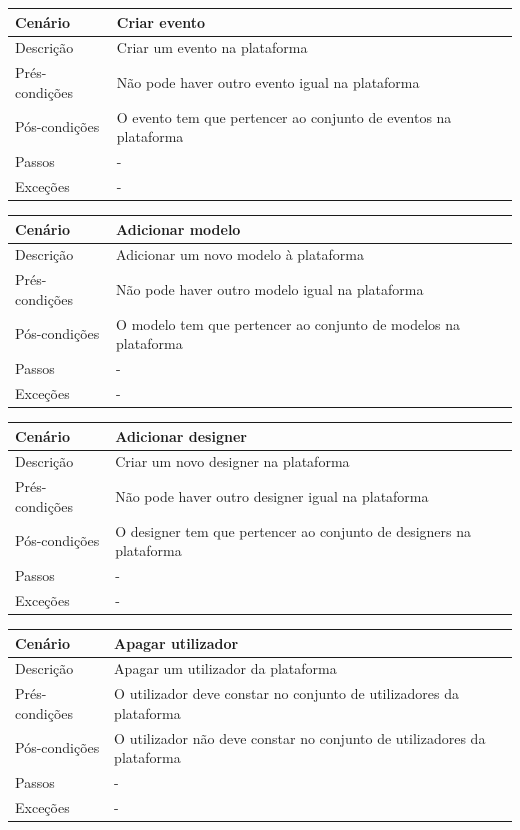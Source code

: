 \documentclass{article}
\begin{document}
\begin{center}
\begin{tabular}{ |p{2.5cm}|p{9cm}| }
\hline
 Cenário & Criar evento \\
\hline
Descrição & 	Criar um evento na plataforma\\
\hline
 Prés-condições &  Não pode haver outro evento igual na plataforma\\
\hline
Pós-condições & O evento tem que pertencer ao conjunto de eventos na plataforma\\
\hline
Passos &  -\\
\hline
Exceções & -\\
\hline
\end{tabular}
\end{center}

\begin{center}
\begin{tabular}{ |p{2.5cm}|p{9cm}| }
\hline
 Cenário & Adicionar modelo \\
\hline
Descrição & 	Adicionar um novo modelo à plataforma\\
\hline
 Prés-condições &  Não pode haver outro modelo igual na plataforma\\
\hline
Pós-condições & O modelo tem que pertencer ao conjunto de modelos na plataforma\\
\hline
Passos &  -\\
\hline
Exceções & -\\
\hline
\end{tabular}
\end{center}

\begin{center}
\begin{tabular}{ |p{2.5cm}|p{9cm}| }
\hline
 Cenário & Adicionar designer \\
\hline
Descrição & 	Criar um novo designer na plataforma\\
\hline
 Prés-condições &  Não pode haver outro designer igual na plataforma\\
\hline
Pós-condições & O designer tem que pertencer ao conjunto de designers na plataforma\\
\hline
Passos &  -\\
\hline
Exceções & -\\
\hline
\end{tabular}
\end{center}

\begin{center}
\begin{tabular}{ |p{2.5cm}|p{9cm}| }
\hline
 Cenário & Apagar utilizador \\
\hline
Descrição & 	Apagar um utilizador da plataforma\\
\hline
 Prés-condições & O utilizador deve constar no conjunto de utilizadores da plataforma\\
\hline
Pós-condições & O utilizador não deve constar no conjunto de utilizadores da plataforma\\
\hline
Passos &  -\\
\hline
Exceções & -\\
\hline
\end{tabular}
\end{center}
\end{document}
